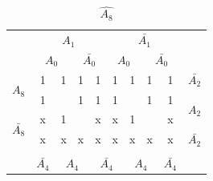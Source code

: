 \documentclass[a4paper,14pt]{article}
\begin{document}
\begin{table}[!htb]
	\begin{minipage}{.5\linewidth}
		\caption{$\hat{A_8}$}
		\centering
		\begin{tabular}{cccccccccc}
			& \multicolumn{4}{c}{$A_1$}                                                                           & \multicolumn{4}{c}{$\bar{A_1}$}                                                                    &                      \\
			& \multicolumn{2}{c}{$A_0$}                         & \multicolumn{2}{c}{$\bar{A_0}$}                   & \multicolumn{2}{c}{$A_0$}                         & \multicolumn{2}{c}{$\bar{A_0}$}                   &                      \\ \cline{2-9}
			\multicolumn{1}{c|}{\multirow{2}{*}{$A_8$}}       & \multicolumn{1}{c|}{1} & \multicolumn{1}{c|}{1} & \multicolumn{1}{c|}{1} & \multicolumn{1}{c|}{1} & \multicolumn{1}{c|}{1} & \multicolumn{1}{c|}{1} & \multicolumn{1}{c|}{1} & \multicolumn{1}{c|}{1} & $\bar{A_2}$            \\ \cline{2-9}
			\multicolumn{1}{c|}{}                           & \multicolumn{1}{c|}{1} & \multicolumn{1}{c|}{}  & \multicolumn{1}{c|}{1} & \multicolumn{1}{c|}{1} & \multicolumn{1}{c|}{1} & \multicolumn{1}{c|}{}  & \multicolumn{1}{c|}{1} & \multicolumn{1}{c|}{1} & \multirow{2}{*}{$A_2$} \\ \cline{2-9}
			\multicolumn{1}{c|}{\multirow{2}{*}{$\bar{A_8}$}} & \multicolumn{1}{c|}{x} & \multicolumn{1}{c|}{1} & \multicolumn{1}{c|}{}  & \multicolumn{1}{c|}{x} & \multicolumn{1}{c|}{x} & \multicolumn{1}{c|}{1} & \multicolumn{1}{c|}{}  & \multicolumn{1}{c|}{x} &                      \\ \cline{2-9}
			\multicolumn{1}{c|}{}                           & \multicolumn{1}{c|}{x} & \multicolumn{1}{c|}{x} & \multicolumn{1}{c|}{x} & \multicolumn{1}{c|}{x} & \multicolumn{1}{c|}{x} & \multicolumn{1}{c|}{x} & \multicolumn{1}{c|}{x} & \multicolumn{1}{c|}{x} & $\bar{A_2}$            \\ \cline{2-9}
			\\
			& $\bar{A_4}$              & \multicolumn{2}{c}{$A_4$}                         & \multicolumn{2}{c}{$\bar{A_4}$}                   & \multicolumn{2}{c}{$A_4$}                         & $\bar{A_4}$              &                     
		\end{tabular}
	\end{minipage}%
	\begin{minipage}{.5\linewidth}
		\centering

\end{minipage}
\end{table}
\end{document}
